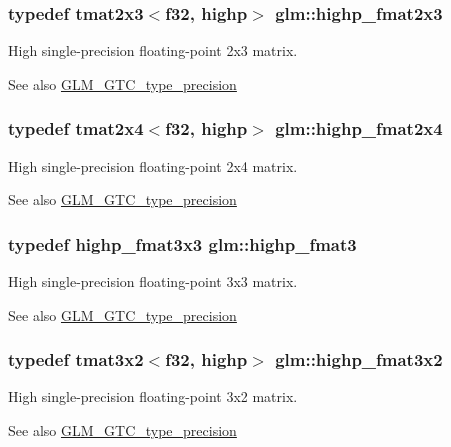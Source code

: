 \subsubsection[{highp\+\_\+fmat2x3}]{\setlength{\rightskip}{0pt plus 5cm}typedef tmat2x3$<${\bf f32}, highp$>$ {\bf glm\+::highp\+\_\+fmat2x3}}\label{namespaceglm_a09c7950cd49474ac5c651d55e6d75195}
High single-\/precision floating-\/point 2x3 matrix. \begin{DoxySeeAlso}{See also}
\hyperlink{group__gtc__type__precision}{G\+L\+M\+\_\+\+G\+T\+C\+\_\+type\+\_\+precision} 
\end{DoxySeeAlso}
\hypertarget{namespaceglm_a7f52a65030238fab7c75fc3fff6267b7}{}
\subsubsection[{highp\+\_\+fmat2x4}]{\setlength{\rightskip}{0pt plus 5cm}typedef tmat2x4$<${\bf f32}, highp$>$ {\bf glm\+::highp\+\_\+fmat2x4}}\label{namespaceglm_a7f52a65030238fab7c75fc3fff6267b7}
High single-\/precision floating-\/point 2x4 matrix. \begin{DoxySeeAlso}{See also}
\hyperlink{group__gtc__type__precision}{G\+L\+M\+\_\+\+G\+T\+C\+\_\+type\+\_\+precision} 
\end{DoxySeeAlso}
\hypertarget{namespaceglm_a3ff9af2eba26aa6df92aa73e1083e81e}{}
\subsubsection[{highp\+\_\+fmat3}]{\setlength{\rightskip}{0pt plus 5cm}typedef {\bf highp\+\_\+fmat3x3} {\bf glm\+::highp\+\_\+fmat3}}\label{namespaceglm_a3ff9af2eba26aa6df92aa73e1083e81e}
High single-\/precision floating-\/point 3x3 matrix. \begin{DoxySeeAlso}{See also}
\hyperlink{group__gtc__type__precision}{G\+L\+M\+\_\+\+G\+T\+C\+\_\+type\+\_\+precision} 
\end{DoxySeeAlso}
\hypertarget{namespaceglm_ae084f1adc158cccc3b45d86d3eea10e7}{}
\subsubsection[{highp\+\_\+fmat3x2}]{\setlength{\rightskip}{0pt plus 5cm}typedef tmat3x2$<${\bf f32}, highp$>$ {\bf glm\+::highp\+\_\+fmat3x2}}\label{namespaceglm_ae084f1adc158cccc3b45d86d3eea10e7}
High single-\/precision floating-\/point 3x2 matrix. \begin{DoxySeeAlso}{See also}
\hyperlink{group__gtc__type__precision}{G\+L\+M\+\_\+\+G\+T\+C\+\_\+type\+\_\+precision} 
\end{DoxySeeAlso}
\hypertarget{namespaceglm_a3390aa5d7faf93394576070f3bd2c1e7}{}
